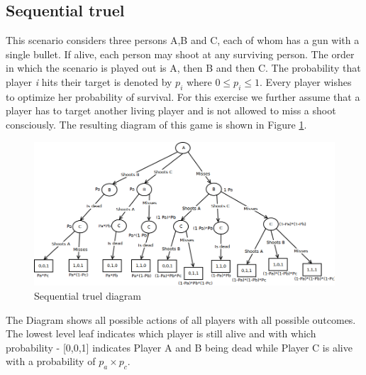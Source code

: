 \documentclass[a4paper, 11pt]{article}
\begin{document}
\newpage
\begin{landscape}
\section{Sequential truel}


This scenario considers three persons A,B and C, each of whom has a gun with a single bullet. If alive, each person may shoot at any surviving person. The order in which the scenario is played out is A, then B and then C. The probability that player \textit{i} hits their target is denoted by $p_i$ where $0\leq p_i\leq 1$. Every player wishes to optimize her probability of survival.
For this exercise we further assume that a player has to target another living player and is not allowed to miss a shoot consciously. The resulting diagram of this game is shown in Figure \ref{fig-SeqTrualDiag}.

\begin{figure}[h]
\caption{Sequential truel diagram}
\label{fig-SeqTrualDiag}
\includegraphics[scale=0.65]{SequentialTruelDiagram.png}
\end{figure}

\end{landscape}

The Diagram shows all possible actions of all players with all possible outcomes. The lowest level leaf indicates which player is still alive and with which probability - [0,0,1] indicates Player A and B being dead while Player C is alive with a probability of $p_a \times p_c$.

\newpage



\end{document}
